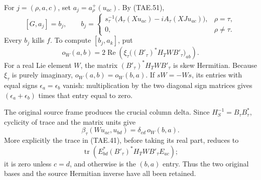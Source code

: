 For \(j=(\rho,a,c)\), set \(a_j=a_\rho^+(u_{ac})\).
By (TAE.51),
\[
 [G,a_j]=b_j,\qquad
 b_j=\begin{cases}
  s_\tau^{-1}\bigl(A_\tau(Xu_{ac})
                   -iA_\tau(XJu_{ac})\bigr),&\rho=\tau,\\
 0,&\rho\ne\tau.
 \end{cases}
 \tag{TAE.59}
\]
Every \(b_j\) kills \(f\).  To compute \([b_j,a_k]\),
put
\[
 o_W(a,b)=
   2\operatorname{Re}\!
       \left(\xi_\tau
              \bigl((B'_\tau)^*H_TWB'_\tau\bigr)_{ab}\right).
 \tag{TAE.60}
\]
For a real Lie element \(W\), the matrix
\((B'_\tau)^*H_TWB'_\tau\) is skew Hermitian.
Because \(\xi_\tau\) is purely imaginary,
\(o_W(a,b)=o_W(b,a)\).  If \(sW=-Ws\), its entries with
equal signs \(\epsilon_a=\epsilon_b\) vanish:
multiplication by the two diagonal sign matrices gives
\((\epsilon_a+\epsilon_b)\) times that entry equal to zero.

The original source frame produces the crucial column delta.
Since \(H_S^{-1}=B_\tau B_\tau^*\), cyclicity of trace and
the matrix units give
\[
 \beta_\tau(Wu_{ac},u_{bd})
                         =\delta_{cd}\,o_W(b,a).
 \tag{TAE.61}
\]
More explicitly the trace in (TAE.41), before taking its
real part, reduces to
\[
 \operatorname{tr}
 (E_{bd}^*(B'_\tau)^*H_TWB'_\tau E_{ac});
\]
it is zero unless \(c=d\), and otherwise is the
\((b,a)\) entry.  Thus the two original bases and the source
Hermitian inverse have all been retained.

